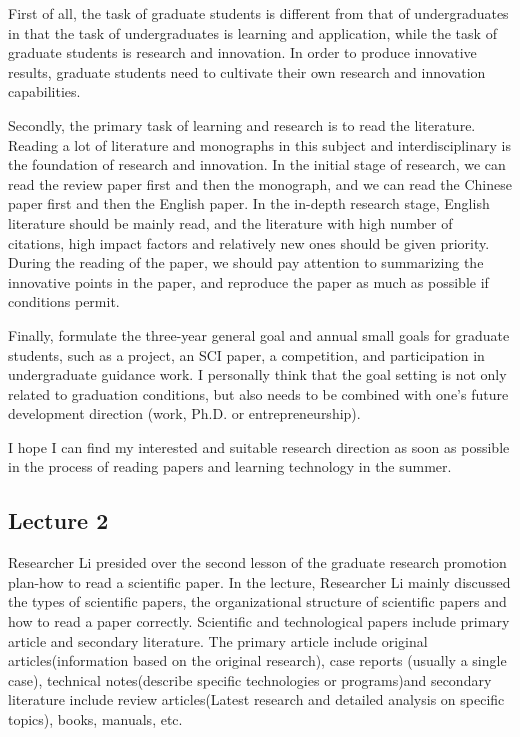 \documentclass[UTF-8]{ctexart}
\begin{document}
First of all, the task of graduate students is different from that of undergraduates in that the task of undergraduates is learning and application, while the task of graduate students is research and innovation. In order to produce innovative results, graduate students need to cultivate their own research and innovation capabilities.

Secondly, the primary task of learning and research is to read the literature. Reading a lot of literature and monographs in this subject and interdisciplinary is the foundation of research and innovation. In the initial stage of research, we can read the review paper first and then the monograph, and we can read the Chinese paper first and then the English paper. In the in-depth research stage, English literature should be mainly read, and the literature with high number of citations, high impact factors and relatively new ones should be given priority. During the reading of the paper, we should pay attention to summarizing the innovative points in the paper, and reproduce the paper as much as possible if conditions permit.

Finally, formulate the three-year general goal and annual small goals for graduate students, such as a project, an SCI paper, a competition, and participation in undergraduate guidance work. I personally think that the goal setting is not only related to graduation conditions, but also needs to be combined with one's future development direction (work, Ph.D. or entrepreneurship).

I hope I can find my interested and suitable research direction as soon as possible in the process of reading papers and learning technology in the summer.

\subsection{Lecture 2}
Researcher Li presided over the second lesson of the graduate research promotion plan-how to read a scientific paper. In the lecture, Researcher Li mainly discussed the types of scientific papers, the organizational structure of scientific papers and how to read a paper correctly.
Scientific and technological papers include primary article and secondary literature. The primary article include original articles(information based on the original research), case reports (usually a single case), technical notes(describe specific technologies or programs)and secondary literature include review articles(Latest research and detailed analysis on specific topics), books, manuals, etc.
\end{document}
